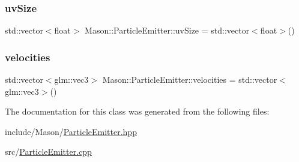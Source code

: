 \hypertarget{class_mason_1_1_particle_emitter_a9c2a9f3d9c113d2503598551c992fde4}{}\label{class_mason_1_1_particle_emitter_a9c2a9f3d9c113d2503598551c992fde4} 
\subsubsection{\texorpdfstring{uv\+Size}{uvSize}}
{\footnotesize\ttfamily std\+::vector$<$float$>$ Mason\+::\+Particle\+Emitter\+::uv\+Size = std\+::vector$<$float$>$()\hspace{0.3cm}{\ttfamily [protected]}}

\hypertarget{class_mason_1_1_particle_emitter_aa72403d590c4528e1a1d9dbf4bc3dfd3}{}\label{class_mason_1_1_particle_emitter_aa72403d590c4528e1a1d9dbf4bc3dfd3} 
\subsubsection{\texorpdfstring{velocities}{velocities}}
{\footnotesize\ttfamily std\+::vector$<$glm\+::vec3$>$ Mason\+::\+Particle\+Emitter\+::velocities = std\+::vector$<$glm\+::vec3$>$()\hspace{0.3cm}{\ttfamily [protected]}}



The documentation for this class was generated from the following files\+:\begin{DoxyCompactItemize}
\item 
include/\+Mason/\hyperlink{_particle_emitter_8hpp}{Particle\+Emitter.\+hpp}\item 
src/\hyperlink{_particle_emitter_8cpp}{Particle\+Emitter.\+cpp}\end{DoxyCompactItemize}
